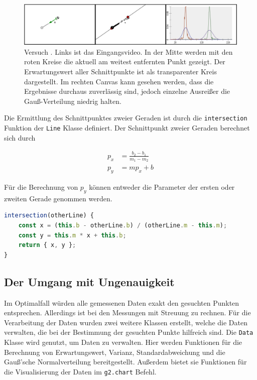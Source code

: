 \begin{figure}
    \centering
    \includegraphics[width=\textwidth]{gfx/pendel2_1.png}
    \caption[Versuch ]{Versuch . Links ist das Eingangsvideo. In der Mitte werden mit den roten Kreise die aktuell am weitest entfernten Punkt gezeigt. Der Erwartungswert aller Schnittpunkte ist als transparenter Kreis dargestellt. Im rechten Canvas kann gesehen werden, dass die Ergebnisse durchaus zuverlässig sind, jedoch einzelne Ausrei{\ss}er die Gau{\ss}-Verteilung niedrig halten.}
    \label{fig:pendel2_1}
\end{figure}

Die Ermittlung des Schnittpunktes zweier Geraden ist durch die \lstinline{intersection} Funktion der \lstinline{Line} Klasse definiert.
Der Schnittpunkt zweier Geraden berechnet sich durch

\begin{equation}
    \begin{split}
        p_x &= \frac{b_2 - b_1}{m_1 - m_2} \\
        p_y &= m p_x + b
    \end{split}
    \label{eq:schnittpunkt}
\end{equation}

Für die Berechnung von $p_y$ können entweder die Parameter der ersten oder zweiten Gerade genommen werden.

\begin{lstlisting}[language=JavaScript, caption={Definition der \lstinline{intersection} Funktion, welche eine Funktion der \lstinline{Line} Klasse darstellt.}, label={lst:line_intersection}]
intersection(otherLine) {
    const x = (this.b - otherLine.b) / (otherLine.m - this.m);
    const y = this.m * x + this.b;
    return { x, y };
}
\end{lstlisting}

\subsection{Der Umgang mit Ungenauigkeit}

Im Optimalfall würden alle gemessenen Daten exakt den gesuchten Punkten entsprechen.
Allerdings ist bei den Messungen mit Streuung zu rechnen.
Für die Verarbeitung der Daten wurden zwei weitere Klassen erstellt, welche die Daten verwalten, die bei der Bestimmung der gesuchten Punkte hilfreich sind.
Die \lstinline{Data} Klasse wird genutzt, um Daten zu verwalten.
Hier werden Funktionen für die Berechnung von Erwartungswert, Varianz, Standardabweichung und die Gau{\ss}'sche Normalverteilung bereitgestellt.
Au{\ss}erdem bietet sie Funktionen für die Visualisierung der Daten im \lstinline{g2.chart} Befehl.

